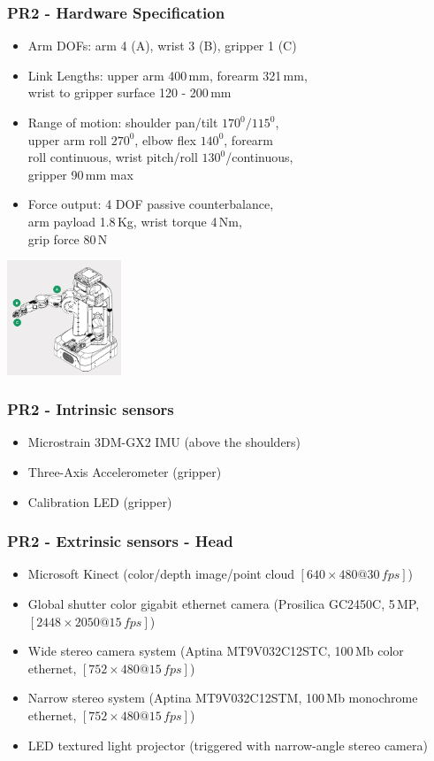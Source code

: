 \documentclass[t]{beamer}
\begin{document}
\begin{frame}
  \frametitle{PR2 - Hardware Specification}
\small{
\begin{itemize}
    \item Arm DOFs: arm 4 (A), wrist 3 (B), gripper 1 (C)
    \item Link Lengths: upper arm 400\,mm, forearm 321\,mm,\\ wrist to gripper surface 120 - 200\,mm
    \item Range of motion: shoulder pan/tilt $170^0/115^0$,\\ upper arm roll $270^0$, elbow flex $140^0$, forearm \\roll continuous, wrist pitch/roll $130^0$/continuous, \\gripper 90\,mm max
    \item Force output: 4 DOF passive counterbalance, \\arm payload 1.8\,Kg, wrist torque 4\,Nm, \\grip force 80\,N
    
\end{itemize}
}
\vspace{-13ex}\hspace{47ex}\includegraphics[width=3.4cm]{img/pr2_arm.png} 
\end{frame}

\begin{frame}
  \frametitle{PR2 - Intrinsic sensors}
\begin{itemize}
    \item Microstrain 3DM-GX2 IMU (above the shoulders)
    \item Three-Axis Accelerometer (gripper)
    \item Calibration LED (gripper) 
\end{itemize}
\end{frame}

\begin{frame}
  \frametitle{PR2 - Extrinsic sensors - Head}
\begin{itemize}
    \item Microsoft Kinect (color/depth image/point cloud $[640\times480 @ 30\,fps]$)
    \item Global shutter color gigabit ethernet camera (Prosilica GC2450C, 5\,MP, $[2448\times2050 @ 15\,fps]$)
    \item Wide stereo camera system (Aptina MT9V032C12STC, 100\,Mb color ethernet, $[752\times480@15\,fps]$)
    \item Narrow stereo system (Aptina MT9V032C12STM, 100\,Mb monochrome ethernet, $[752\times480@15\,fps]$)    
    \item LED textured light projector (triggered with narrow-angle stereo camera)
\end{itemize}
\end{frame}
\end{document}
